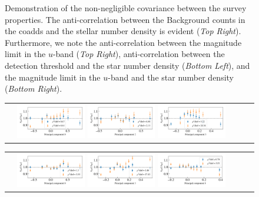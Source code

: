 \documentclass[fleqn,usenatbib,useAMS]{mnras}
\begin{document}
\begin{figure}
\begin{tabular}{cc}
\end{tabular}
\caption{\label{fig:sys_correlation} Demonstration of the non-negligible covariance between the survey properties. The anti-correlation between the Background counts in the coadds and the stellar number density is evident (\textit{Top Right}). Furthermore, we note the anti-correlation between the magnitude limit in the $u$-band (\textit{Top Right}), anti-correlation between the detection threshold and the star number density (\textit{Bottom Left}), and the magnitude limit in the $u$-band and the star number density (\textit{Bottom Right}).} 
\end{figure}


\begin{figure}
\begin{tabular}{ccc}
\includegraphics[width=0.3\textwidth]{figures_tmp/sys/result_pca_ngal_0_15_0_poly_1.png}
\includegraphics[width=0.3\textwidth]{figures_tmp/sys/result_pca_ngal_0_15_2_poly_1.png}
\includegraphics[width=0.3\textwidth]{figures_tmp/sys/result_pca_ngal_0_15_3_poly_1.png}
\end{tabular}

\begin{tabular}{ccc}
\includegraphics[width=0.3\textwidth]{figures_tmp/sys/result_pca_ngal_0_3_0_poly_1.png}
\includegraphics[width=0.3\textwidth]{figures_tmp/sys/result_pca_ngal_0_3_3_poly_1.png}
\includegraphics[width=0.3\textwidth]{figures_tmp/sys/result_pca_ngal_0_3_8_poly_1.png}
\end{tabular}


\end{figure}
\end{document}
